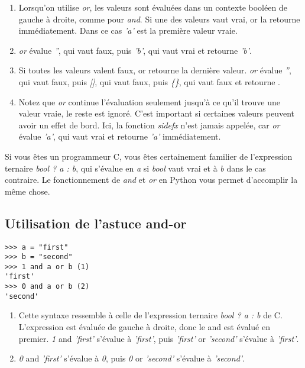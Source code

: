 \begin{enumerate}
    \item{Lorsqu’on utilise \emph{or}, les valeurs sont évaluées dans un contexte booléen de gauche à droite, comme pour \emph{and}. Si une des valeurs vaut vrai, or la retourne immédiatement. Dans ce cas \emph{'a'} est la première valeur vraie.}
    \item{\emph{or} évalue \emph{''}, qui vaut faux, puis \emph{'b'}, qui vaut vrai et retourne \emph{'b'}.}
    \item{Si toutes les valeurs valent faux, or retourne la dernière valeur. \emph{or} évalue \emph{''}, qui vaut faux, puis \emph{[]}, qui vaut faux, puis \emph{\{\}}, qui vaut faux et retourne {}.}
    \item{Notez que \emph{or} continue l’évaluation seulement jusqu’à ce qu’il trouve une valeur vraie, le reste est ignoré. C’est important si certaines valeurs peuvent avoir un effet de bord. Ici, la fonction \emph{sidefx} n’est jamais appelée, car \emph{or} évalue \emph{'a'}, qui vaut vrai et retourne \emph{'a'} immédiatement.}
\end{enumerate}

\medskip
Si vous êtes un programmeur C, vous êtes certainement familier de l’expression ternaire \emph{bool ? a : b}, qui s’évalue en \emph{a} si \emph{bool} vaut vrai et à \emph{b} dans le cas contraire. Le fonctionnement de \emph{and} et \emph{or} en Python vous permet d’accomplir la même chose.

\subsection{Utilisation de l'astuce and-or}

\begin{example}
\begin{lstlisting}
>>> a = "first"
>>> b = "second"
>>> 1 and a or b (1)
'first'
>>> 0 and a or b (2)
'second'
\end{lstlisting}
\end{example}

\begin{enumerate}
    \item{Cette syntaxe ressemble à celle de l’expression ternaire \emph{bool ? a : b} de C. L’expression est évaluée de gauche à droite, donc le and est évalué en premier. \emph{1} and \emph{'first'} s’évalue à \emph{'first'}, puis \emph{'first'} or \emph{'second'} s’évalue à \emph{'first'}.}
    \item{\emph{0} and \emph{'first'} s’évalue à \emph{0}, puis \emph{0} or \emph{'second'} s’évalue à \emph{'second'}.}
\end{enumerate}

